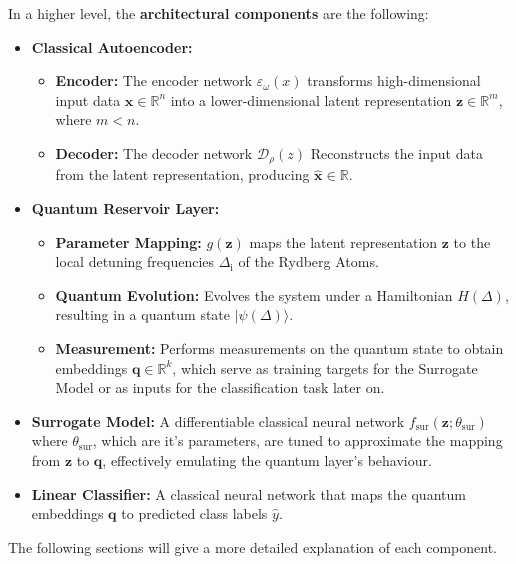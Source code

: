 \documentclass[conference]{IEEEtran}
\begin{document}
In a higher level, the \textbf{architectural components} are the following:
\begin{itemize}
    \item \textbf{Classical Autoencoder:}
        \begin{itemize}
            \item \textbf{Encoder:}
            The encoder network \(\varepsilon_\omega(x)\)
            transforms high-dimensional input data \(\mathbf{x} \in \mathbb{R}^{n}\) into 
            a lower-dimensional latent representation \(\mathbf{z} \in \mathbb{R}^m\), 
            where \(m < n\).
            \item \textbf{Decoder:}
            The decoder network \(\mathcal{D}_\rho(z)\)
            Reconstructs the input data from the latent representation, producing
            \(\mathbf{\hat{x}} \in \mathbb{R}\).
        \end{itemize}

    \item \textbf{Quantum Reservoir Layer:}
        \begin{itemize}
            \item \textbf{Parameter Mapping:}
            \(g(\mathbf{z})\) maps the latent representation \(\mathbf{z}\) to the local detuning frequencies
            \(\Delta_{\mathrm{i}}\) of the Rydberg Atoms.
            \item \textbf{Quantum Evolution:}
            Evolves the system under a Hamiltonian \(H(\Delta)\), resulting in a quantum 
            state \(|\psi(\Delta)\rangle\).
            \item \textbf{Measurement:}
            Performs measurements on the quantum state to obtain embeddings \(\mathbf{q} \in \mathbb{R}^k\), which serve as training targets for the Surrogate Model or as 
            inputs for the classification task later on.
        \end{itemize}

    \item \textbf{Surrogate Model:}
    A differentiable classical neural network \( f_{\text{sur}}(\mathbf{z}; \theta_{\text{sur}}) \)
    where \(\theta_{\text{sur}}\), which are it's parameters, are tuned to approximate the 
    mapping from \(\mathbf{z}\) to \(\mathbf{q}\), effectively emulating
    the quantum layer's behaviour.

    \item \textbf{Linear Classifier:}
    A classical neural network that maps the quantum embeddings \(\mathbf{q}\) to 
    predicted class labels \(\hat{y}\).

\end{itemize}
The following sections will give a more detailed explanation of each 
component.
\end{document}
